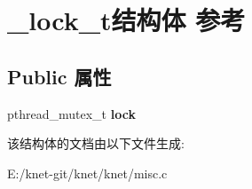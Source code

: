 \hypertarget{struct__lock__t}{}\section{\+\_\+lock\+\_\+t结构体 参考}
\label{struct__lock__t}
\subsection*{Public 属性}
\begin{DoxyCompactItemize}
\item 
\hypertarget{struct__lock__t_ad70401bf297691adf8f5407185246bb4}{}pthread\+\_\+mutex\+\_\+t {\bfseries lock}\label{struct__lock__t_ad70401bf297691adf8f5407185246bb4}

\end{DoxyCompactItemize}


该结构体的文档由以下文件生成\+:\begin{DoxyCompactItemize}
\item 
E\+:/knet-\/git/knet/knet/misc.\+c\end{DoxyCompactItemize}
